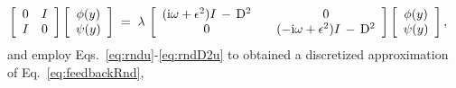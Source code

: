 \documentclass[%
secnumarabic,%
 amssymb, amsmath,%
 aps,prf,superscriptaddress,longbibliography
frontmatterverbose,
]{revtex4-2}
\begin{document}
\begin{subequations}
\begin{align}
  \left[\begin{array}{cc}
    0 & I\\
    I & 0
  \end{array}\right]\left[\begin{array}{c}
    \phi (y)\\
    \psi (y)
  \end{array}\right]\;&=\;\lambda \,\left[\begin{array}{ccc}
    (\mathrm i \omega + \epsilon^2) I \,-\, \mathrm D^2 & & 0\\
    0 && (-\mathrm i \omega + \epsilon^2) I \,-\, \mathrm D^2
  \end{array}\right] \left[\begin{array}{c}
    \phi (y)\\
    \psi (y)
  \end{array}\right],\label{eq:feedbackRnda}
\end{align}
\end{subequations}
and employ Eqs.~\eqref{eq:rndu}-\eqref{eq:rndD2u} to obtained a discretized approximation of Eq.~\eqref{eq:feedbackRnd}, 
\end{document}
